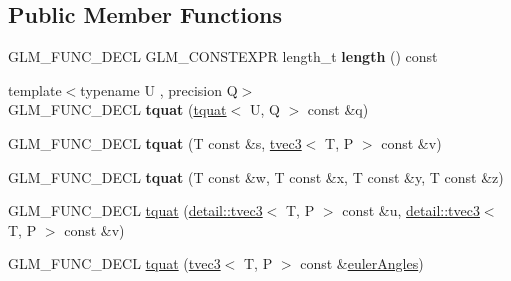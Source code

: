 \subsection*{Public Member Functions}
\begin{DoxyCompactItemize}
\item 
G\+L\+M\+\_\+\+F\+U\+N\+C\+\_\+\+D\+E\+CL G\+L\+M\+\_\+\+C\+O\+N\+S\+T\+E\+X\+PR length\+\_\+t {\bfseries length} () const \hypertarget{structglm_1_1detail_1_1tquat_a430be0cf6fd0006c904b9ecdb03bd711}{}\label{structglm_1_1detail_1_1tquat_a430be0cf6fd0006c904b9ecdb03bd711}

\item 
{\footnotesize template$<$typename U , precision Q$>$ }\\G\+L\+M\+\_\+\+F\+U\+N\+C\+\_\+\+D\+E\+CL {\bfseries tquat} (\hyperlink{structglm_1_1detail_1_1tquat}{tquat}$<$ U, Q $>$ const \&q)\hypertarget{structglm_1_1detail_1_1tquat_aa6b415284ed415db4ac328f3c0fd42d7}{}\label{structglm_1_1detail_1_1tquat_aa6b415284ed415db4ac328f3c0fd42d7}

\item 
G\+L\+M\+\_\+\+F\+U\+N\+C\+\_\+\+D\+E\+CL {\bfseries tquat} (T const \&s, \hyperlink{structglm_1_1detail_1_1tvec3}{tvec3}$<$ T, P $>$ const \&v)\hypertarget{structglm_1_1detail_1_1tquat_aba298cc62aaee76c3d19294f33454187}{}\label{structglm_1_1detail_1_1tquat_aba298cc62aaee76c3d19294f33454187}

\item 
G\+L\+M\+\_\+\+F\+U\+N\+C\+\_\+\+D\+E\+CL {\bfseries tquat} (T const \&w, T const \&x, T const \&y, T const \&z)\hypertarget{structglm_1_1detail_1_1tquat_af383bd6a9c92f94bc8b7ba0be770d4e5}{}\label{structglm_1_1detail_1_1tquat_af383bd6a9c92f94bc8b7ba0be770d4e5}

\item 
G\+L\+M\+\_\+\+F\+U\+N\+C\+\_\+\+D\+E\+CL \hyperlink{structglm_1_1detail_1_1tquat_a203189580d111eb8a73ed10a1d640464}{tquat} (\hyperlink{structglm_1_1detail_1_1tvec3}{detail\+::tvec3}$<$ T, P $>$ const \&u, \hyperlink{structglm_1_1detail_1_1tvec3}{detail\+::tvec3}$<$ T, P $>$ const \&v)
\item 
G\+L\+M\+\_\+\+F\+U\+N\+C\+\_\+\+D\+E\+CL \hyperlink{structglm_1_1detail_1_1tquat_acfc1714febec517f5313a91c3ae2e687}{tquat} (\hyperlink{structglm_1_1detail_1_1tvec3}{tvec3}$<$ T, P $>$ const \&\hyperlink{group__gtc__quaternion_gade4034f49ccadf63cb31a7fb5fa3c8aa}{euler\+Angles})\hypertarget{structglm_1_1detail_1_1tquat_acfc1714febec517f5313a91c3ae2e687}{}\label{structglm_1_1detail_1_1tquat_acfc1714febec517f5313a91c3ae2e687}


\end{DoxyCompactItemize}

